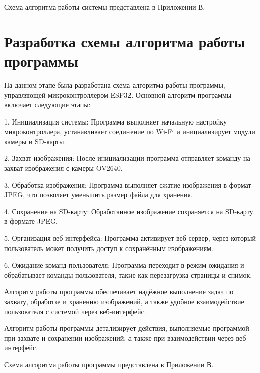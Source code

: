 Схема алгоритма работы системы представлена в Приложении В.

\section{Разработка схемы алгоритма работы программы}
\hspace*{12.5 mm}На данном этапе была разработана схема 
алгоритма работы программы, управляющей микроконтроллером 
ESP32. Основной алгоритм программы включает следующие этапы:

1. Инициализация системы: Программа выполняет начальную 
настройку микроконтроллера, устанавливает соединение по Wi-Fi 
и инициализирует модули камеры и SD-карты.

2. Захват изображения: После инициализации программа 
отправляет команду на захват изображения с камеры OV2640.

3. Обработка изображения: Программа выполняет сжатие 
изображения в формат JPEG, что позволяет уменьшить размер 
файла для хранения.

4. Сохранение на SD-карту: Обработанное изображение 
сохраняется на SD-карту в формате JPEG.

5. Организация веб-интерфейса: Программа активирует 
веб-сервер, через который пользователь может получить доступ к 
сохранённым изображениям.

6. Ожидание команд пользователя: Программа переходит в 
режим ожидания и обрабатывает команды пользователя, такие как 
перезагрузка страницы и снимок.

Алгоритм работы программы обеспечивает надёжное выполнение 
задач по захвату, обработке и хранению изображений, а также 
удобное взаимодействие пользователя с системой через веб-интерфейс.

Алгоритм работы программы детализирует действия, выполняемые 
программой при захвате и сохранении изображений, а также при 
взаимодействии через веб-интерфейс.

Схема алгоритма работы программы представлена в Приложении В.